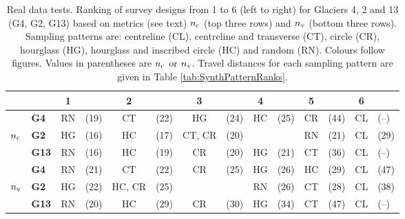 \documentclass[twocolumn,letterpaper]{igs}
\begin{document}
\begin{table}[]
\centering
\caption{Real data tests. Ranking of survey designs from 1 to 6 (left to right) for Glaciers 4, 2 and 13 (G4, G2, G13) based on metrics (see text) $n_{\rm c}$ (top three rows) and $n_{\rm v}$ (bottom three rows). Sampling patterns are: centreline (CL), centreline and transverse (CT), circle (CR), hourglass (HG), hourglass and inscribed circle (HC) and random (RN). Colours follow figures. Values in parentheses are $n_{\rm c}$ or $n_{\rm v}$. Travel distances for each sampling pattern are given in Table \ref{tab:SynthPatternRanks}.}
\label{tab:RealPatternRanks}
\begin{tabular}{clclclclclclcl}
\hline
          && \textbf{1} && \textbf{2} && \textbf{3} && \textbf{4} && \textbf{5} && \textbf{6} \\
 \hline
                & \textbf{G4}   & \textcolor{RN}{RN}         & (19) & \textcolor{CT}{CT}         & (22)         &  \textcolor{HG}{HG}        &  (24)        & \textcolor{HC}{HC}         & (25)           &  \textcolor{CR}{CR}        & (44) & \textcolor{CL}{CL} & (--) \\
$n_{\rm c}$         & \textbf{G2}   & \textcolor{HG}{HG}         & (16)         &  \textcolor{HC}{HC}        &  (17)          & \textcolor{CT}{CT}, \textcolor{CR}{CR}        & (20)         &          &          & \textcolor{RN}{RN}         & (21) & \textcolor{CL}{CL} & (29) \\
                & \textbf{G13} & \textcolor{RN}{RN}         & (16)         & \textcolor{HC}{HC} & (19)         & \textcolor{CR}{CR}                 & (20)         &           \textcolor{HG}{HG}        &   (21)        & \textcolor{CT}{CT}         & (36) & \textcolor{CL}{CL} & (--) \\
\hline
                & \textbf{G4}   & \textcolor{RN}{RN}         & (21)         &   \textcolor{CT}{CT}        &  (22)         & \textcolor{CR}{CR}         & (25)         & \textcolor{HG}{HG}                 & (26)         & \textcolor{HC}{HC} & (29) & \textcolor{CL}{CL} & (47) \\
$n_{\rm v}$         & \textbf{G2}   & \textcolor{HG}{HG}         & (22)         & \textcolor{HC}{HC}, \textcolor{CR}{CR}         & (25)         &            &         &  \textcolor{RN}{RN}                & (26)        &  \textcolor{CT}{CT}         & (28) & \textcolor{CL}{CL} & (38) \\
                & \textbf{G13} & \textcolor{RN}{RN}         & (20)         & \textcolor{HC}{HC}         & (29)         & \textcolor{CR}{CR}                 & (30)         &  \textcolor{HG}{HG}        & (34)         & \textcolor{CT}{CT}         & (47) & \textcolor{CL}{CL} & (--) \\
\hline                
\end{tabular}
\end{table}
\end{document}
